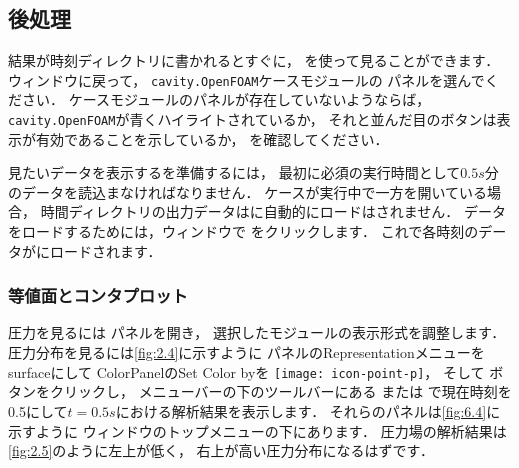 \subsection{後処理}
\label{ssec:2.1.4}
結果が時刻ディレクトリに書かれるとすぐに，
を使って見ることができます．
ウィンドウに戻って，
\texttt{cavity.OpenFOAM}ケースモジュールの
%
%
パネルを選んでください．
ケースモジュールのパネルが存在していないようならば，
\texttt{cavity.OpenFOAM}が青くハイライトされているか，
それと並んだ目のボタンは表示が有効であることを示しているか，
を確認してください．

見たいデータを表示するを準備するには，
最初に必須の実行時間として$0.5\unit{s}$分のデータを読込まなければなりません．
ケースが実行中で一方を開いている場合，
時間ディレクトリの出力データはに自動的にロードはされません．
データをロードするためには，ウィンドウで
%
%
をクリックします．
これで各時刻のデータがにロードされます．

\subsubsection{等値面とコンタプロット}
\label{sssec:2.1.4.1}
圧力を見るには
%
%
パネルを開き，
選択したモジュールの表示形式を調整します．
圧力分布を見るには\autoref{fig:2.4}に示すように
パネルのRepresentationメニューをsurfaceにして
ColorPanelのSet Color byを \texttt{[image: icon-point-p]}，
そして
%
%
ボタンをクリックし，
メニューバーの下のツールバーにある
%
%
または
%
%
で現在時刻を0.5にして$t = 0.5\unit{s}$における解析結果を表示します．
それらのパネルは\autoref{fig:6.4}に示すように
ウィンドウのトップメニューの下にあります．
圧力場の解析結果は\autoref{fig:2.5}のように左上が低く，
右上が高い圧力分布になるはずです．

